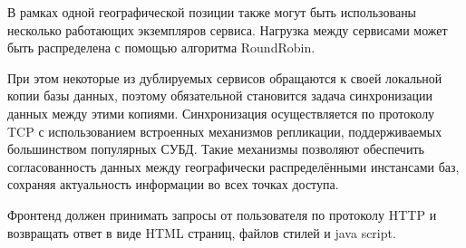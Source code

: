 В рамках одной географической позиции также могут быть использованы несколько работающих экземпляров сервиса. Нагрузка между сервисами может быть распределена с помощью алгоритма RoundRobin.

При этом некоторые из дублируемых сервисов обращаются к своей локальной копии базы данных, поэтому обязательной становится задача синхронизации данных между этими копиями. Синхронизация осуществляется по протоколу TCP с использованием встроенных механизмов репликации, поддерживаемых большинством популярных СУБД. Такие механизмы позволяют обеспечить согласованность данных между географически распределёнными инстансами баз, сохраняя актуальность информации во всех точках доступа.

Фронтенд должен принимать запросы от пользователя по протоколу HTTP и возвращать ответ в виде HTML страниц, файлов стилей и java script.

